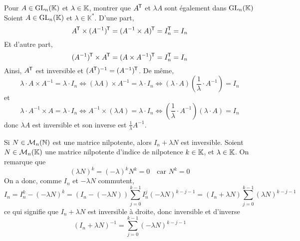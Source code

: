 \documentclass{article}
\begin{document}
\begin{question_kholle}
	{Pour $A\in\mathrm{GL}_{n}(\mathbb K)$ et $\lambda\in\mathbb K$, montrer que $A^{\mkern-1.5mu\mathsf{T}}$ et $\lambda A$ sont également dans $\mathrm{GL}_{n}(\mathbb K)$}
	Soient $A \in \mathrm{GL}_n(\mathbb{K})$ et $\lambda \in \mathbb{K}^*$. D’une part,
	\[
		A^{\mkern-1.5mu\mathsf{T}} \times (A^{-1})^{\mkern-1.5mu\mathsf{T}} = (A^{-1} \times  A)^{\mkern-1.5mu\mathsf{T}} = I_{n}^{\mkern-1.5mu\mathsf{T}} = I_{n}
	\]
	Et d’autre part,
	\[
		(A^{-1})^{\mkern-1.5mu\mathsf{T}} \times A^{\mkern-1.5mu\mathsf{T}} = (A \times A^{-1})^{\mkern-1.5mu\mathsf{T}} = I_{n}^{\mkern-1.5mu\mathsf{T}} = I_{n}
	\]
	Ainsi, $A^{\mkern-1.5mu\mathsf{T}}$ est inversible et $(A^{\mkern-1.5mu\mathsf{T}})^{-1}=(A^{-1})^{\mkern-1.5mu\mathsf{T}}$.
	De même,
	\[
		\lambda \cdot A \times A^{-1} = \lambda \cdot I_{n} \iff (\lambda A) \times A^{-1} = \lambda \cdot I_{n} \iff (\lambda \cdot A)\left(\frac{1}{\lambda} \cdot A^{-1}\right) = I_{n}
	\]
	et
	\[
		\lambda \cdot A^{-1} \times A = \lambda \cdot I_{n} \iff A^{-1} \times (\lambda A) = \lambda \cdot I_{n} \iff \left(\frac{1}{\lambda} \cdot A^{-1}\right)(\lambda \cdot A) = I_{n}
	\]
	donc $\lambda A$ est inversible et son inverse est $\displaystyle\frac{1}{\lambda}A^{-1}$.
\end{question_kholle}

\begin{question_kholle}
	{Si $N\in\mathcal{M}_{n}(\mathbb N)$ est une matrice nilpotente, alors $I_n + \lambda N$ est inversible.}
	Soient $N\in\mathcal{M}_{n}(\mathbb K)$ une matrice nilpotente d’indice de nilpotence $k\in\mathbb K$, et $\lambda\in\mathbb K$. On remarque que
	\[
		(\lambda N)^{k} = (-\lambda)^{k}N^{k} = 0 \quad\text{car } N^{k}=0
	\]
	On a donc, comme $I_{n}$ et $-\lambda N$ commutent,
	\[
		I_{n} = I_{n}^{k} - (-\lambda N)^{k} = (I_{n}-(-\lambda N))\sum_{j=0}^{k-1}I_{n}^{j}(-\lambda N)^{k-j-1} = (I_{n}+\lambda N)\sum_{j=0}^{k-1}(\lambda N)^{k-j-1}
	\]
	ce qui signifie que $I_{n}+\lambda N$ est inversible à droite, donc inversible et d’inverse
	\[
		(I_{n} + \lambda N)^{-1} = \sum_{j=0}^{k-1}(-\lambda N)^{k-j-1}
	\]
\end{question_kholle}
\end{document}
